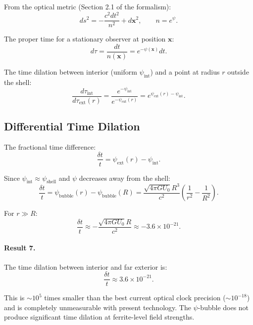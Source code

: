 \documentclass[amsmath,amssymb,aps,prd,superscriptaddress,nofootinbib]{revtex4-2}
\begin{document}
From the optical metric (Section 2.1 of the formalism):
\begin{equation}
ds^2 = -\frac{c^2 dt^2}{n^2} + d\mathbf{x}^2, \qquad n = e^\psi.
\end{equation}

The proper time for a stationary observer at position $\mathbf{x}$:
\begin{equation}
d\tau = \frac{dt}{n(\mathbf{x})} = e^{-\psi(\mathbf{x})} dt.
\end{equation}

The time dilation between interior (uniform $\psi_\text{int}$) and a
point at radius $r$ outside the shell:
\begin{equation}
\frac{d\tau_\text{int}}{d\tau_\text{ext}(r)} = \frac{e^{-\psi_\text{int}}}{e^{-\psi_\text{ext}(r)}} = e^{\psi_\text{ext}(r) - \psi_\text{int}}.
\end{equation}

\subsection{Differential Time Dilation}

The fractional time difference:
\begin{equation}
\frac{\delta t}{t} = \psi_\text{ext}(r) - \psi_\text{int}.
\end{equation}

Since $\psi_\text{int} \approx \psi_\text{shell}$ and $\psi$ decreases
away from the shell:
\begin{equation}
\frac{\delta t}{t} = \psi_\text{bubble}(r) - \psi_\text{bubble}(R)
= \frac{\sqrt{4\pi G U_0} R^3}{c^2}\left(\frac{1}{r^2} - \frac{1}{R^2}\right).
\end{equation}

For $r \gg R$:
\begin{equation}
\frac{\delta t}{t} \approx -\frac{\sqrt{4\pi G U_0} R}{c^2} \approx -3.6 \times 10^{-21}.
\end{equation}

\paragraph{Result 7.} The time dilation between interior and far exterior is:
\begin{equation}
\boxed{
\frac{\delta t}{t} \approx 3.6 \times 10^{-21}.
}
\end{equation}

This is $\sim 10^5$ times smaller than the best current optical clock
precision ($\sim 10^{-18}$) and is completely unmeasurable with present
technology. The $\psi$-bubble does not produce significant time dilation
at ferrite-level field strengths.
\end{document}
